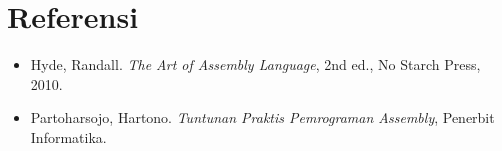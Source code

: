 \section{Referensi}
\begin{itemize}
\item Hyde, Randall. \textit{The Art of Assembly Language}, 2nd ed., No Starch Press, 2010.
\item Partoharsojo, Hartono. \textit{Tuntunan Praktis Pemrograman Assembly}, Penerbit Informatika.
\end{itemize}


